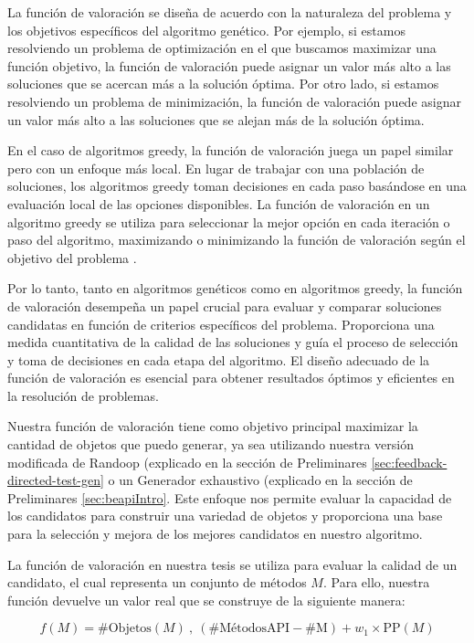 La función de valoración se diseña de acuerdo con la naturaleza del problema y los objetivos específicos del algoritmo genético. Por ejemplo, si estamos resolviendo un problema de optimización en el que buscamos maximizar una función objetivo, la función de valoración puede asignar un valor más alto a las soluciones que se acercan más a la solución óptima. Por otro lado, si estamos resolviendo un problema de minimización, la función de valoración puede asignar un valor más alto a las soluciones que se alejan más de la solución óptima.

En el caso de algoritmos greedy, la función de valoración juega un papel similar pero con un enfoque más local. En lugar de trabajar con una población de soluciones, los algoritmos greedy toman decisiones en cada paso basándose en una evaluación local de las opciones disponibles. La función de valoración en un algoritmo greedy se utiliza para seleccionar la mejor opción en cada iteración o paso del algoritmo, maximizando o minimizando la función de valoración según el objetivo del problema \cite{cormen2009introduction}.

Por lo tanto, tanto en algoritmos genéticos como en algoritmos greedy, la función de valoración desempeña un papel crucial para evaluar y comparar soluciones candidatas en función de criterios específicos del problema. Proporciona una medida cuantitativa de la calidad de las soluciones y guía el proceso de selección y toma de decisiones en cada etapa del algoritmo. El diseño adecuado de la función de valoración es esencial para obtener resultados óptimos y eficientes en la resolución de problemas.

Nuestra función de valoración tiene como objetivo principal maximizar la cantidad de objetos que puedo generar, ya sea utilizando nuestra versión modificada de Randoop (explicado en la sección de Preliminares \ref{sec:feedback-directed-test-gen} o un Generador exhaustivo (explicado en la sección de Preliminares \ref{sec:beapiIntro}. Este enfoque nos permite evaluar la capacidad de los candidatos para construir una variedad de objetos y proporciona una base para la selección y mejora de los mejores candidatos en nuestro algoritmo.

La función de valoración en nuestra tesis se utiliza para evaluar la calidad de un candidato, el cual representa un conjunto de métodos $M$. Para ello, nuestra función devuelve un valor real que se construye de la siguiente manera:

\[
f(M) = \text{{\#Objetos}}(M) \ , \ (\text{{\#MétodosAPI}} - \text{{\#M}}) + w_1 \times \text{{PP}}(M)
\]

